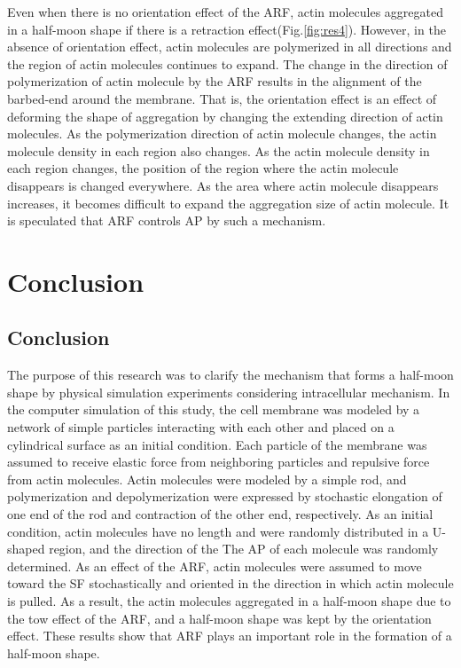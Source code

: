 \documentclass[a4paper,12pt, oneside]{book}
\begin{document}
Even when there is no orientation effect of the ARF, actin molecules aggregated in a half-moon shape if there is a retraction effect(Fig.\ref{fig:res4}).
However, in the absence of orientation effect, actin molecules are polymerized in all directions and the region of actin molecules continues to expand.
The change in the direction of polymerization of actin molecule by the ARF results in the alignment of the barbed-end around the membrane.
That is, the orientation effect is an effect of deforming the shape of aggregation by changing the extending direction of actin molecules.
As the polymerization direction of actin molecule changes, the actin molecule density in each region also changes.
As the actin molecule density in each region changes, the position of the region where the actin molecule disappears is changed everywhere.
As the area where actin molecule disappears increases, it becomes difficult to expand the aggregation size of actin molecule.
It is speculated that ARF controls AP by such a mechanism.

\chapter{Conclusion}
\section{Conclusion}
The purpose of this research was to clarify the mechanism that forms a half-moon shape by physical simulation experiments considering intracellular mechanism.
In the computer simulation of this study, the cell membrane was modeled by a network of simple particles interacting with each other and placed on a cylindrical surface as an initial condition.
Each particle of the membrane was assumed to receive elastic force from neighboring particles and repulsive force from actin molecules.
Actin molecules were modeled by a simple rod, and polymerization and depolymerization were expressed by stochastic elongation of one end of the rod and contraction of the other end, respectively.
As an initial condition, actin molecules have no length and were randomly distributed in a U-shaped region, and the direction of the The AP of each molecule was randomly determined.
As an effect of the ARF, actin molecules were assumed to move toward the SF stochastically and oriented in the direction in which actin molecule is pulled.
As a result, the actin molecules aggregated in a half-moon shape due to the tow effect of the ARF, and a half-moon shape was kept by the orientation effect.
These results show that ARF plays an important role in the formation of a half-moon shape.
\end{document}
